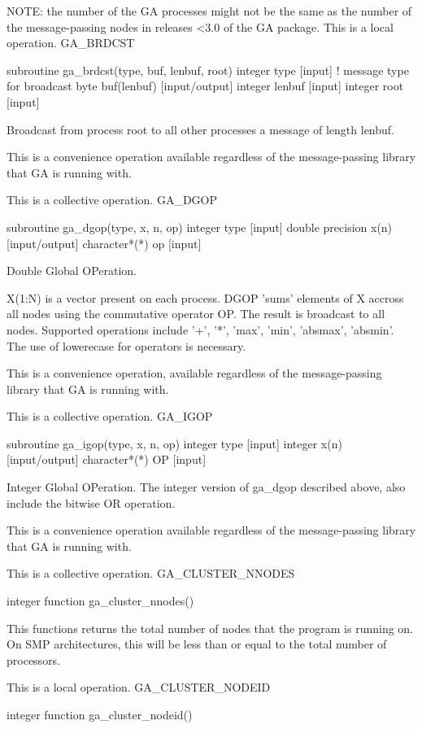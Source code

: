 NOTE: the number of the GA processes might not be the same as the
number of the message-passing nodes in releases <3.0 of the GA package.
This is a local operation. GA\_BRDCST

subroutine ga\_brdcst(type, buf, lenbuf, root) integer type {[}input{]}
! message type for broadcast byte buf(lenbuf) {[}input/output{]} integer
lenbuf {[}input{]} integer root {[}input{]}

Broadcast from process root to all other processes a message of length
lenbuf.

This is a convenience operation available regardless of the message-passing
library that GA is running with.

This is a collective operation. GA\_DGOP

subroutine ga\_dgop(type, x, n, op) integer type {[}input{]} double
precision x(n) {[}input/output{]} character{*}({*}) op {[}input{]}

Double Global OPeration.

X(1:N) is a vector present on each process. DGOP 'sums' elements of
X accross all nodes using the commutative operator OP. The result
is broadcast to all nodes. Supported operations include '+', '{*}',
'max', 'min', 'absmax', 'absmin'. The use of lowerecase for operators
is necessary.

This is a convenience operation, available regardless of the message-passing
library that GA is running with.

This is a collective operation. GA\_IGOP

subroutine ga\_igop(type, x, n, op) integer type {[}input{]} integer
x(n) {[}input/output{]} character{*}({*}) OP {[}input{]}

Integer Global OPeration. The integer version of ga\_dgop described
above, also include the bitwise OR operation.

This is a convenience operation available regardless of the message-passing
library that GA is running with.

This is a collective operation. GA\_CLUSTER\_NNODES

integer function ga\_cluster\_nnodes()

This functions returns the total number of nodes that the program
is running on. On SMP architectures, this will be less than or equal
to the total number of processors.

This is a local operation. GA\_CLUSTER\_NODEID

integer function ga\_cluster\_nodeid()


